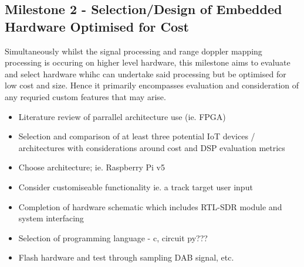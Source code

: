 \documentclass[12pt,a4paper]{article}
\begin{document}
\subsection{Milestone 2 - Selection/Design of Embedded Hardware Optimised for Cost} 
Simultaneously whilst the signal processing and range doppler mapping processing is occuring on higher level hardware, this milestone aims to evaluate and select hardware whihc can undertake said processing but be optimised for low cost and size. Hence it primarily encompasses evaluation and consideration of any requried custom features that may arise.
\begin{multicols}{2}
    \begin{itemize}
    \item Literature review of parrallel architecture use (ie. FPGA)
    \item Selection and comparison of at least three potential IoT devices / architectures with considerations around cost and DSP evaluation metrics
    \item Choose architecture; ie. Raspberry Pi v5
    \item Consider customiseable functionality ie. a track target user input
    \item Completion of hardware schematic which includes RTL-SDR module and system interfacing
    \item Selection of programming language - c, circuit py???
    \item Flash hardware and test through sampling DAB signal, etc. 
    \end{itemize}
\end{multicols}
\end{document}
